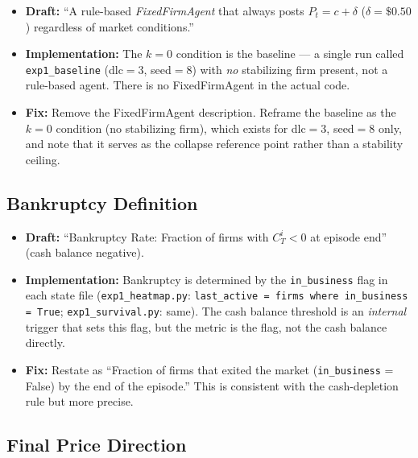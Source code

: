 \documentclass{article}
\begin{document}
\begin{itemize}
  \item \textbf{Draft:} ``A rule-based \textit{FixedFirmAgent} that always posts
        $P_t = c + \delta$ ($\delta = \$0.50$) regardless of market conditions.''
  \item \textbf{Implementation:} The $k=0$ condition is the baseline --- a single
        run called \texttt{exp1\_baseline} (dlc$=3$, seed$=8$) with \emph{no}
        stabilizing firm present, not a rule-based agent.  There is no
        FixedFirmAgent in the actual code.
  \item \textbf{Fix:} Remove the FixedFirmAgent description.  Reframe the baseline
        as the $k=0$ condition (no stabilizing firm), which exists for dlc$=3$,
        seed$=8$ only, and note that it serves as the collapse reference point
        rather than a stability ceiling.
\end{itemize}

\subsection{Bankruptcy Definition}

\begin{itemize}
  \item \textbf{Draft:} ``Bankruptcy Rate: Fraction of firms with $C_T^i < 0$ at
        episode end'' (cash balance negative).
  \item \textbf{Implementation:} Bankruptcy is determined by the \texttt{in\_business}
        flag in each state file (\texttt{exp1\_heatmap.py}: \texttt{last\_active =
        firms where in\_business = True}; \texttt{exp1\_survival.py}: same).
        The cash balance threshold is an \emph{internal} trigger that sets this
        flag, but the metric is the flag, not the cash balance directly.
  \item \textbf{Fix:} Restate as ``Fraction of firms that exited the market
        (\texttt{in\_business} = False) by the end of the episode.''  This is
        consistent with the cash-depletion rule but more precise.
\end{itemize}

\subsection{Final Price Direction}
\end{document}
